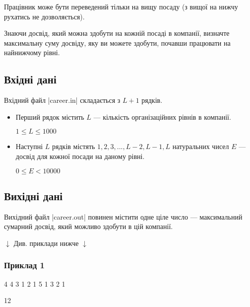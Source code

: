 \documentclass[12pt,a4paper]{article}
\begin{document}
Працівник може бути переведений тільки на вищу посаду (з вищої на нижчу рухатись не дозволяється).

Знаючи досвід, який можна здобути на кожній посаді в компанії, визначте максимальну суму досвіду, яку ви можете здобути, почавши працювати на найнижчому рівні.


\subsection*{Вхідні дані}

Вхідний файл |career.in| складається з \(L + 1\) рядків.

\begin{itemize}
    \item Перший рядок містить \(L\) --- кількість організаційних рівнів в компанії.

          \(1 \leq L \leq 1000\)

    \item Наступні \(L\) рядків містять \(1, 2, 3, ..., L-2, L-1, L\) натуральних чисел \(E\) --- досвід для кожної посади на даному рівні.

          \(0 \leq E < 10000\)
\end{itemize}


\subsection*{Вихідні дані}

Вихідний файл |career.out| повинен містити одне ціле число --- максимальний сумарний досвід, який можливо здобути в цій компанії.


\begin{pagebottomtext}
$\downarrow$ Див. приклади нижче $\downarrow$
\end{pagebottomtext}


\pagebreak


\subsubsection*{Приклад 1}

\textbf{}

\begin{codeblock}
4
4
3 1
2 1 5
1 3 2 1
\end{codeblock}

\textbf{}

\begin{codeblock}
12
\end{codeblock}
\end{document}
